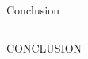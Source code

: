 \documentclass{beamer}
\begin{document}
\begin{frame}{Conclusion}
\begin{columns}
    \begin{column}{.5\linewidth}
        \begin{itemize}
            CONCLUSION
        \end{itemize}
    \end{column}
\end{columns}
\end{frame}

\end{document}
